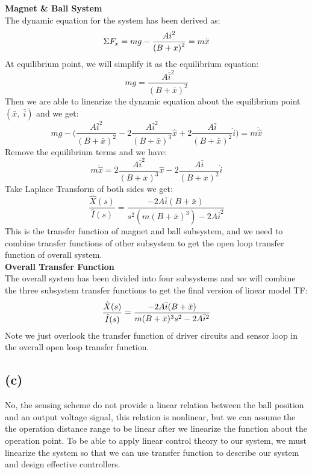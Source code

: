 \documentclass[letterpaper]{article}
\begin{document}
\textbf{\large{Magnet \& Ball System}}\\
The dynamic equation for the system has been derived as:
$$\Sigma F_x = mg - \frac{\displaystyle A i^2}{\displaystyle (B + x)^2} = m\ddot{x}$$
At equilibrium point, we will simplify it as the equilibrium equation:
$$mg = \frac{A \bar{i}^2}{(B + \bar{x})^2} $$
Then we are able to linearize the dynamic equation about the equilibrium point $\left(\bar{x},\; \bar{i}\right)$ and we get:
$$mg - \Big( \frac{A \bar{i}^2}{(B + \bar{x})^2} - 2\frac{A \bar{i}^2}{(B + \bar{x})^3}\hat{x} + 2\frac{A \bar{i}}{(B + \bar{x})^2}\hat{i} \Big) = m\ddot{\hat{x}}$$
Remove the equilibrium terms and we have:
$$m\ddot{\hat{x}} =  2\frac{A \bar{i}^2}{(B + \bar{x})^3}\hat{x} - 2\frac{A \bar{i}}{(B + \bar{x})^2}\hat{i}$$
Take Laplace Transform of both sides we get:
$$\frac{\hat{X}(s)}{\hat{I}(s)} = \frac{-2 A \bar{i} (B + \bar{x})}{s^2 (m (B + \bar{x})^3) - 2 A\bar{i}^2}$$
This is the transfer function of magnet and ball subsystem, and we need to combine transfer functions of other subsystem to get the open loop transfer function of overall system.\\

\textbf{\large{Overall Transfer Function}}\\
The overall system has been divided into four subsystems and we will combine the three subsystem transfer functions to get the final version of linear model TF:
$$ \frac{\displaystyle \hat{X}(s)}{\displaystyle \hat{I}(s)} = \frac{-2 A \bar{i} (B + \bar{x})}{m(B+\bar{x})^3 s^2 - 2 A \bar{i}^2}$$
Note we just overlook the transfer function of driver circuits and sensor loop in the overall open loop transfer function.
\subsection*{(c)}
No, the sensing scheme do not provide a linear relation between the ball position and an output voltage signal, this relation is nonlinear, but we can assume the the operation distance range to be linear after we linearize the function about the operation point. To be able to apply linear control theory to our system, we must linearize the system so that we can use transfer function to describe our system and design effective controllers.
\end{document}
